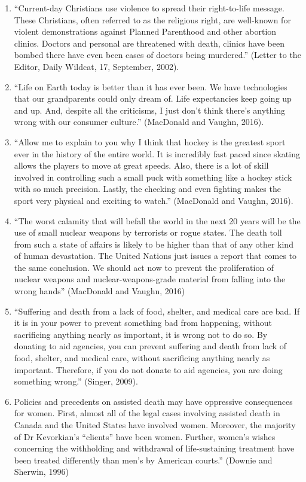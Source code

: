 \documentclass[
]{book}
\begin{document}
\begin{enumerate}
\item
  ``Current-day Christians use violence to spread their right-to-life message. These Christians, often referred to as the religious right, are well-known for violent demonstrations against Planned Parenthood and other abortion clinics. Doctors and personal are threatened with death, clinics have been bombed there have even been cases of doctors being murdered.'' (Letter to the Editor, Daily Wildcat, 17, September, 2002).
\item
  ``Life on Earth today is better than it has ever been. We have technologies that our grandparents could only dream of. Life expectancies keep going up and up. And, despite all the criticisms, I just don't think there's anything wrong with our consumer culture.'' (MacDonald and Vaughn, 2016).
\item
  ``Allow me to explain to you why I think that hockey is the greatest sport ever in the history of the entire world. It is incredibly fast paced since skating allows the players to move at great speeds. Also, there is a lot of skill involved in controlling such a small puck with something like a hockey stick with so much precision. Lastly, the checking and even fighting makes the sport very physical and exciting to watch.'' (MacDonald and Vaughn, 2016).
\item
  ``The worst calamity that will befall the world in the next 20 years will be the use of small nuclear weapons by terrorists or rogue states. The death toll from such a state of affairs is likely to be higher than that of any other kind of human devastation. The United Nations just issues a report that comes to the same conclusion. We should act now to prevent the proliferation of nuclear weapons and nuclear-weapons-grade material from falling into the wrong hands'' (MacDonald and Vaughn, 2016)
\item
  ``Suffering and death from a lack of food, shelter, and medical care are bad. If it is in your power to prevent something bad from happening, without sacrificing anything nearly as important, it is wrong not to do so. By donating to aid agencies, you can prevent suffering and death from lack of food, shelter, and medical care, without sacrificing anything nearly as important. Therefore, if you do not donate to aid agencies, you are doing something wrong.'' (Singer, 2009).
\item
  Policies and precedents on assisted death may have oppressive consequences for women. First, almost all of the legal cases involving assisted death in Canada and the United States have involved women. Moreover, the majority of Dr Kevorkian's ``clients'' have been women. Further, women's wishes concerning the withholding and withdrawal of life-sustaining treatment have been treated differently than men's by American courts.'' (Downie and Sherwin, 1996)

\end{enumerate}
\end{document}
